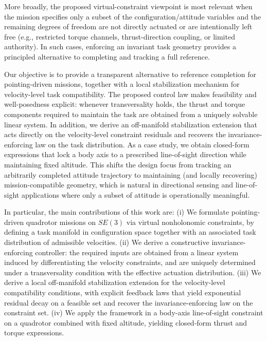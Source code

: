 \documentclass[letterpaper, 10 pt, conference]{ieeeconf}
\begin{document}
More broadly, the proposed virtual-constraint viewpoint is most relevant when the mission specifies only a subset of the configuration/attitude variables and the remaining degrees of freedom are not directly actuated or are intentionally left free (e.g., restricted torque channels, thrust-direction coupling, or limited authority). In such cases, enforcing an invariant task geometry provides a principled alternative to completing and tracking a full reference.

Our objective is to provide a transparent alternative to reference completion for pointing-driven missions, together with a local stabilization mechanism for velocity-level task compatibility. The proposed control law makes feasibility and well-posedness explicit: whenever transversality holds, the thrust and torque components required to maintain the task are obtained from a uniquely solvable linear system. {In addition, we derive an off-manifold stabilization extension that acts directly on the velocity-level constraint residuals and recovers the invariance-enforcing law on the task distribution.} As a case study, we obtain closed-form expressions that lock a body axis to a prescribed line-of-sight direction while maintaining fixed altitude. This shifts the design focus from tracking an arbitrarily completed attitude trajectory to maintaining (and locally recovering) mission-compatible geometry, which is natural in directional sensing and line-of-sight applications where only a subset of attitude is operationally meaningful.


In particular, the main contributions of this work are: (i) We formulate pointing-driven quadrotor missions on $SE(3)$ via virtual nonholonomic constraints, by defining a task manifold in configuration space together with an associated task distribution of admissible velocities. (ii) We derive a constructive invariance-enforcing controller: the required inputs are obtained from a linear system induced by differentiating the velocity constraints, and are uniquely determined under a transversality condition with the effective actuation distribution. (iii) We derive a local off-manifold stabilization extension for the velocity-level compatibility conditions, with explicit feedback laws that yield exponential residual decay on a feasible set and recover the invariance-enforcing law on the constraint set. (iv) We apply the framework in a body-axis line-of-sight constraint  on a quadrotor combined with fixed altitude, yielding closed-form thrust and torque expressions.
\end{document}
